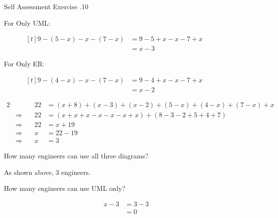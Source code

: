 \documentclass[\main/notes.tex]{subfiles}
\begin{document}
\begin{exercise}{Self Assessment Exercise \thechapter.10}
\begin{questions}
\begin{answer}
\begin{description}
								\item[For Only UML:] $
									\begin{aligned}[t]
										9 - (5 - x) - x - (7 - x) &= 9 - 5 + x - x - 7 + x\\
										&= x - 3
									\end{aligned} $
								\item[For Only ER:] $
									\begin{aligned}[t]
										9 - (4 - x) - x - (7 - x) &= 9 - 4 + x - x - 7 + x\\
										&= x - 2
									\end{aligned} $
							\end{description}
							\begin{alignat*}{2}
								& & 22 &= (x + 8) + (x - 3) + (x - 2) + (5 - x) + (4 - x) + (7 - x) + x\\
								& \Rightarrow \quad & 22 &= (x + x + x - x - x - x + x) + (8 - 3 - 2 + 5 + 4 + 7)\\
								& \Rightarrow \quad & 22 &= x + 19\\
								& \Rightarrow \quad & x &= 22 - 19\\
								& \Rightarrow \quad & x &= 3
							\end{alignat*}
						\end{answer}
						\begin{questions}[first=\bfseries]
							\item How many engineers can use all three diagrams?\\
								\begin{answer}
									As shown above, $3$ engineers.
								\end{answer}
							\item How many engineers can use UML only?
								\begin{answer}
									\begin{align*}
										x - 3 &= 3 - 3\\
										&= 0
									\end{align*}
								\end{answer}
						\end{questions}
					\end{questions}
				\end{exercise}
\end{document}
